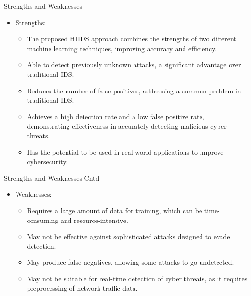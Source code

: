 \documentclass{beamer}
\begin{document}
\begin{frame}{Strengths and Weaknesses}


  \begin{itemize}
    \item Strengths:
      \begin{itemize}
        \item The proposed HIIDS approach combines the strengths of two different machine learning techniques, improving accuracy and efficiency.
        \item Able to detect previously unknown attacks, a significant advantage over traditional IDS.
        \item Reduces the number of false positives, addressing a common problem in traditional IDS.
        \item Achieves a high detection rate and a low false positive rate, demonstrating effectiveness in accurately detecting malicious cyber threats.
        \item Has the potential to be used in real-world applications to improve cybersecurity.
      \end{itemize}
  \end{itemize}
\end{frame}


\begin{frame}{Strengths and Weaknesses Cntd.}


\begin{itemize}
    \item Weaknesses:
      \begin{itemize}
        \item Requires a large amount of data for training, which can be time-consuming and resource-intensive.
        \item May not be effective against sophisticated attacks designed to evade detection.
        \item May produce false negatives, allowing some attacks to go undetected.
        \item May not be suitable for real-time detection of cyber threats, as it requires preprocessing of network traffic data.
      \end{itemize}
  \end{itemize}
\end{frame}
\end{document}

